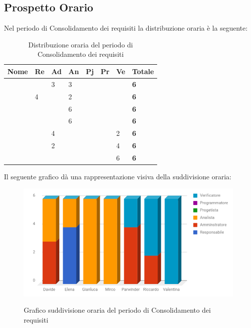 \documentclass[PianoDiProgetto.tex]{subfiles}
\begin{document}
\subsection{Prospetto Orario}
Nel periodo di Consolidamento dei requisiti la distribuzione oraria è la seguente:
\begin{center}

\begin{table}[htbp]
	\centering
	\renewcommand\arraystretch{1.5}
	\begin{tabularx}{\textwidth}{p{4cm}|p{1cm}|p{1cm}|p{1cm}|p{1cm}|p{1cm}|p{1cm}|p{2cm}}
		\hline
		\textbf{Nome} & \textbf{Re} & \textbf{Ad} & \textbf{An} & \textbf{Pj} & \textbf{Pr} & \textbf{Ve} & \textbf{Totale} \\
		\hline
		\Davide & \ & 3 & 3 & \ & \ & \ & \textbf{6} \\
		\hline
		\Elena & 4 & \ & 2 & \ & \ & \ & \textbf{6} \\
		\hline
		\Gianluca & \ & \ & 6 & \ & \ & \ & \textbf{6} \\
		\hline
		\Mirco & \ & \ & 6 & \ & \ & \ & \textbf{6} \\
		\hline
		\Parwinder & \ & 4 & \ & \ & \ & 2 & \textbf{6} \\
		\hline
		\Riccardo & \ & 2 & \ & \ & \ & 4 & \textbf{6} \\
		\hline
		\Valentina & \ & \ & \ & \ & \ & 6 & \textbf{6} \\
		\hline
	\end{tabularx}
	\caption{Distribuzione oraria del periodo di Consolidamento dei requisiti}
	\label{my-label}
\end{table}
\end{center}
Il seguente grafico dà una rappresentazione visiva della suddivisione oraria:

\begin{figure}[h]
	\centering
	\includegraphics[width=12.5cm]{images/prospettoOrario/consolidamento.png}
	\label{fig:foo}
	\caption{Grafico suddivisione oraria del periodo di Consolidamento dei requisiti}
\end{figure} 
\end{document}
